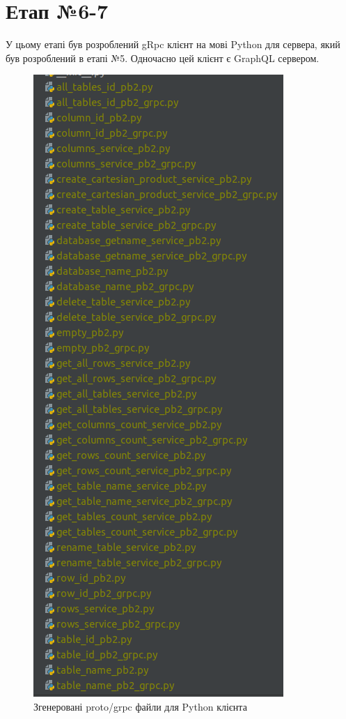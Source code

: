 \documentclass[a4paper, 12pt]{article}
\begin{document}
\section{Етап №6-7}
У цьому етапі був розроблений gRpc клієнт на мові Python для сервера, який був розроблений в етапі №5. Одночасно цей клієнт є GraphQL сервером.

\begin{figure}[H]
\centering
\includegraphics[scale=0.5]{resources/gRpcPythonFiles.png}
\caption{Згенеровані proto/grpc файли для Python клієнта}
\end{figure}
\end{document}
